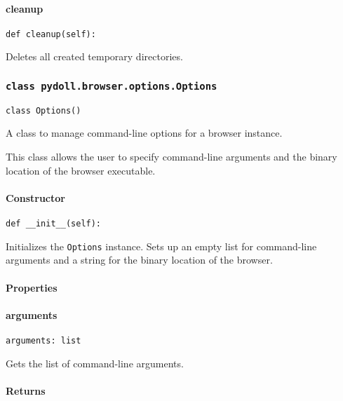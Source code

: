 \documentclass{article}
\begin{document}
\paragraph{cleanup}

\begin{lstlisting}[style=pythonstyle]
def cleanup(self):
\end{lstlisting}

\noindent Deletes all created temporary directories.

\subsubsection*{\texttt{class pydoll.browser.options.Options}}
\noindent\texttt{class Options()}

\noindent A class to manage command-line options for a browser instance.

\noindent This class allows the user to specify command-line arguments and the binary location of the browser executable.

\paragraph{Constructor}

\begin{lstlisting}[style=pythonstyle]
def __init__(self):
\end{lstlisting}

\noindent Initializes the \lstinline[style=pythonstyle]|Options| instance. Sets up an empty list for command-line arguments and a string for the binary location of the browser.

\paragraph{Properties}
\paragraph{arguments}

\begin{lstlisting}[style=pythonstyle]
arguments: list
\end{lstlisting}

\noindent Gets the list of command-line arguments.

\paragraph{Returns}
\end{document}
